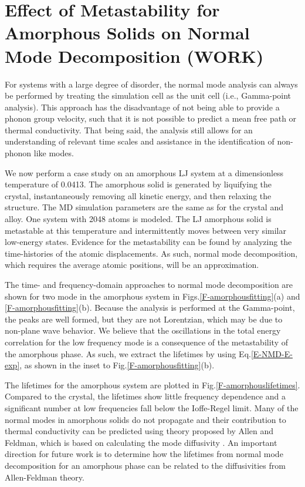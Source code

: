 \section{\label{A:metastability}Effect of Metastability for   
Amorphous Solids on Normal Mode Decomposition (WORK)}

For systems with a large degree of disorder, the normal mode analysis can 
always be performed by treating the simulation cell as the unit cell 
(i.e., Gamma-point analysis). This approach has the disadvantage of not 
being able to provide a phonon group velocity, such that it is not 
possible to predict a mean free path or thermal conductivity. That being 
said, the analysis still allows for an understanding of relevant time 
scales and assistance in the identification of non-phonon like modes.
\cite{allen_diffusons_1999}

We now perform a case study on an amorphous LJ system at a dimensionless 
temperature of 0.0413. The amorphous solid is generated by liquifying the 
crystal, instantaneously removing all kinetic energy, and then relaxing 
the structure. The MD simulation parameters are the same as for the 
crystal and alloy. One system with 2048 atoms is modeled. The LJ 
amorphous solid is metastable at this temperature and intermittently 
moves between very similar low-energy states. Evidence for the 
metastability can be found by analyzing the time-histories of the atomic 
displacements. As such, normal mode decomposition, which requires the 
average atomic positions, will be an approximation.

The time- and frequency-domain approaches to normal mode decomposition 
are shown for two mode in the amorphous system in 
Figs.\ref{F-amorphousfitting}(a) and \ref{F-amorphousfitting}(b). 
Because the analysis is performed at the Gamma-point, the peaks are 
well formed, but they are not Lorentzian, which may be due to non-plane 
wave behavior. We believe that the oscillations in the total energy 
correlation for the low frequency mode is a consequence of the 
metastability of the amorphous phase. As such, we extract the lifetimes 
by using Eq.\eqref{E-NMD-E-exp}, as shown in the inset to 
Fig.\ref{F-amorphousfitting}(b).

The lifetimes for the amorphous system are plotted in 
Fig.\ref{F-amorphouslifetimes}. Compared to the crystal, the lifetimes 
show little frequency dependence and a significant number at low 
frequencies fall below the Ioffe-Regel limit. Many of the normal modes 
in amorphous solids do not propagate and their contribution to thermal 
conductivity can be predicted using theory proposed by Allen and Feldman, 
which is based on calculating the mode diffusivity 
\cite{allen_thermal_1993,feldman_thermal_1993,shenogin_predicting_2009,
he_heat_2011}. 
An important 
direction for future work is to determine how the lifetimes from normal 
mode decomposition for an amorphous phase can be related to the 
diffusivities from Allen-Feldman theory.


